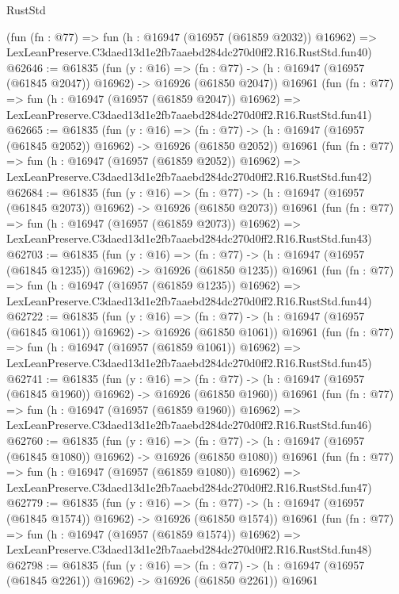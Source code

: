 \begin{lexlean}{RustStd}
\begin{coremodule}
    (fun (fn : @77) =>
    fun (h : @16947 (@16957 (@61859 @2032)) @16962) =>
    LexLeanPreserve.C3daed13d1e2fb7aaebd284dc270d0ff2.R16.RustStd.fun40)
@62646 := @61835
    (fun (y : @16) =>
    (fn : @77) -> (h : @16947 (@16957 (@61845 @2047)) @16962) -> @16926 (@61850 @2047))
    @16961
    (fun (fn : @77) =>
    fun (h : @16947 (@16957 (@61859 @2047)) @16962) =>
    LexLeanPreserve.C3daed13d1e2fb7aaebd284dc270d0ff2.R16.RustStd.fun41)
@62665 := @61835
    (fun (y : @16) =>
    (fn : @77) -> (h : @16947 (@16957 (@61845 @2052)) @16962) -> @16926 (@61850 @2052))
    @16961
    (fun (fn : @77) =>
    fun (h : @16947 (@16957 (@61859 @2052)) @16962) =>
    LexLeanPreserve.C3daed13d1e2fb7aaebd284dc270d0ff2.R16.RustStd.fun42)
@62684 := @61835
    (fun (y : @16) =>
    (fn : @77) -> (h : @16947 (@16957 (@61845 @2073)) @16962) -> @16926 (@61850 @2073))
    @16961
    (fun (fn : @77) =>
    fun (h : @16947 (@16957 (@61859 @2073)) @16962) =>
    LexLeanPreserve.C3daed13d1e2fb7aaebd284dc270d0ff2.R16.RustStd.fun43)
@62703 := @61835
    (fun (y : @16) =>
    (fn : @77) -> (h : @16947 (@16957 (@61845 @1235)) @16962) -> @16926 (@61850 @1235))
    @16961
    (fun (fn : @77) =>
    fun (h : @16947 (@16957 (@61859 @1235)) @16962) =>
    LexLeanPreserve.C3daed13d1e2fb7aaebd284dc270d0ff2.R16.RustStd.fun44)
@62722 := @61835
    (fun (y : @16) =>
    (fn : @77) -> (h : @16947 (@16957 (@61845 @1061)) @16962) -> @16926 (@61850 @1061))
    @16961
    (fun (fn : @77) =>
    fun (h : @16947 (@16957 (@61859 @1061)) @16962) =>
    LexLeanPreserve.C3daed13d1e2fb7aaebd284dc270d0ff2.R16.RustStd.fun45)
@62741 := @61835
    (fun (y : @16) =>
    (fn : @77) -> (h : @16947 (@16957 (@61845 @1960)) @16962) -> @16926 (@61850 @1960))
    @16961
    (fun (fn : @77) =>
    fun (h : @16947 (@16957 (@61859 @1960)) @16962) =>
    LexLeanPreserve.C3daed13d1e2fb7aaebd284dc270d0ff2.R16.RustStd.fun46)
@62760 := @61835
    (fun (y : @16) =>
    (fn : @77) -> (h : @16947 (@16957 (@61845 @1080)) @16962) -> @16926 (@61850 @1080))
    @16961
    (fun (fn : @77) =>
    fun (h : @16947 (@16957 (@61859 @1080)) @16962) =>
    LexLeanPreserve.C3daed13d1e2fb7aaebd284dc270d0ff2.R16.RustStd.fun47)
@62779 := @61835
    (fun (y : @16) =>
    (fn : @77) -> (h : @16947 (@16957 (@61845 @1574)) @16962) -> @16926 (@61850 @1574))
    @16961
    (fun (fn : @77) =>
    fun (h : @16947 (@16957 (@61859 @1574)) @16962) =>
    LexLeanPreserve.C3daed13d1e2fb7aaebd284dc270d0ff2.R16.RustStd.fun48)
@62798 := @61835
    (fun (y : @16) =>
    (fn : @77) -> (h : @16947 (@16957 (@61845 @2261)) @16962) -> @16926 (@61850 @2261))
    @16961

\end{coremodule}
\end{lexlean}
